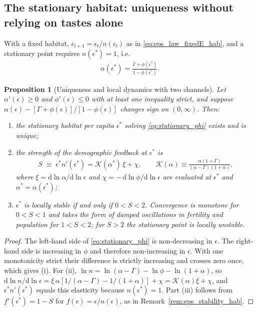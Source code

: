 \documentclass[11pt]{article}
\newtheorem{proposition}{Proposition}
\begin{document}
\subsection{The stationary habitat: uniqueness without relying on tastes alone}
With a fixed habitat, $\epsilon_{t+1}=\epsilon_t/n(\epsilon_t)$ as in
\eqref{eq:eps_law_fixedE_hab}, and a stationary point requires $n(\epsilon^{\ast})=1$, i.e.
\begin{align}
\alpha(\epsilon^{\ast})=\frac{\Gamma+\phi(\epsilon^{\ast})}{1-\phi(\epsilon^{\ast})} .
\label{eq:stationary_phi}
\end{align}

\begin{proposition}[Uniqueness and local dynamics with two channels]
\label{prop:two_channels}
Let $\alpha'(\epsilon)\ge 0$ and $\phi'(\epsilon)\le 0$ with at least one inequality strict, and
suppose $\alpha(\epsilon)-\left[\Gamma+\phi(\epsilon)\right]/\left[1-\phi(\epsilon)\right]$ changes
sign on $(0,\infty)$. Then:
\begin{enumerate}
\item[(i)] the stationary habitat per capita $\epsilon^{\ast}$ solving \eqref{eq:stationary_phi}
exists and is unique;
\item[(ii)] the strength of the demographic feedback at $\epsilon^{\ast}$ is
\begin{align}
S\;\equiv\;\epsilon^{\ast}n'(\epsilon^{\ast})
=\mathcal{K}(\alpha^{\ast})\,\xi+\chi,
\qquad
\mathcal{K}(\alpha)\equiv\frac{\alpha(1+\Gamma)}{(\alpha-\Gamma)(1+\alpha)},
\label{eq:S_def}
\end{align}
where $\xi=\mathrm{d}\ln\alpha/\mathrm{d}\ln\epsilon$ and
$\chi=-\,\mathrm{d}\ln\phi/\mathrm{d}\ln\epsilon$ are evaluated at $\epsilon^{\ast}$ and
$\alpha^{\ast}=\alpha(\epsilon^{\ast})$;
\item[(iii)] $\epsilon^{\ast}$ is locally stable if and only if $0<S<2$. Convergence is monotone
for $0<S<1$ and takes the form of damped oscillations in fertility and population for $1<S<2$; for
$S>2$ the stationary point is locally unstable.
\end{enumerate}
\end{proposition}

\begin{proof}
The left-hand side of \eqref{eq:stationary_phi} is non-decreasing in $\epsilon$. The right-hand
side is increasing in $\phi$ and therefore non-increasing in $\epsilon$. With one monotonicity
strict their difference is strictly increasing and crosses zero once, which gives (i). For (ii),
$\ln n=\ln(\alpha-\Gamma)-\ln\phi-\ln(1+\alpha)$, so
$\mathrm{d}\ln n/\mathrm{d}\ln\epsilon
=\xi\,\alpha\left[1/(\alpha-\Gamma)-1/(1+\alpha)\right]+\chi=\mathcal{K}(\alpha)\xi+\chi$, and
$\epsilon^{\ast}n'(\epsilon^{\ast})$ equals this elasticity because $n(\epsilon^{\ast})=1$. Part
(iii) follows from $f'(\epsilon^{\ast})=1-S$ for $f(\epsilon)=\epsilon/n(\epsilon)$, as in
Remark~\ref{rem:eps_stability_hab}.
\end{proof}
\end{document}
